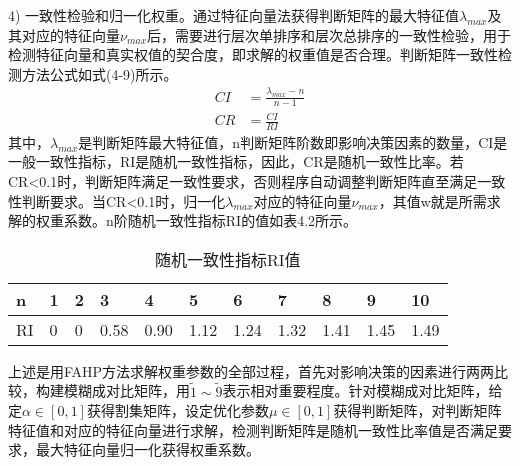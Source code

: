 4) 一致性检验和归一化权重。通过特征向量法获得判断矩阵的最大特征值$\lambda_{max}$及其对应的特征向量$\nu_{max}$后，需要进行层次单排序和层次总排序的一致性检验，用于检测特征向量和真实权值的契合度，即求解的权重值是否合理。判断矩阵一致性检测方法公式如式(4-9)所示。
\begin{equation}
\begin{split}
CI &= \frac{\lambda_{max}-n}{n-1} \\
CR &= \frac{CI}{RI}
\end{split}
\end{equation}
其中，$\lambda_{max}$是判断矩阵最大特征值，n判断矩阵阶数即影响决策因素的数量，CI是一般一致性指标，RI是随机一致性指标，因此，CR是随机一致性比率。若CR<0.1时，判断矩阵满足一致性要求，否则程序自动调整判断矩阵直至满足一致性判断要求。当CR<0.1时，归一化$\lambda_{max}$对应的特征向量$\nu_{max}$，其值w就是所需求解的权重系数。n阶随机一致性指标RI的值如表4.2所示。
\begin{table}[htbp]
	\centering\dawu[1.3]
	\caption{随机一致性指标RI值}
	\begin{tabular}{|p{0.8cm}<{\centering}|p{0.8cm}<{\centering}|p{0.8cm}<{\centering}|p{0.8cm}<{\centering}|p{0.8cm}<{\centering}|p{0.8cm}<{\centering}|p{0.8cm}<{\centering}|p{0.8cm}<{\centering}|p{0.8cm}<{\centering}|p{0.8cm}<{\centering}|p{0.8cm}<{\centering}|} \hline
	n & 1 & 2 & 3 & 4 & 5 & 6 & 7 & 8 & 9 & 10 \\ \hline
	RI & 0 & 0 & 0.58 & 0.90 & 1.12 & 1.24 & 1.32 & 1.41 & 1.45 & 1.49 \\ \hline
	\end{tabular}
\end{table}

上述是用FAHP方法求解权重参数的全部过程，首先对影响决策的因素进行两两比较，构建模糊成对比矩阵，用$\widetilde{1}\sim \widetilde{9}$表示相对重要程度。针对模糊成对比矩阵，给定$\alpha\in[0,1]$获得割集矩阵，设定优化参数$\mu \in[0,1]$获得判断矩阵，对判断矩阵特征值和对应的特征向量进行求解，检测判断矩阵是随机一致性比率值是否满足要求，最大特征向量归一化获得权重系数。

